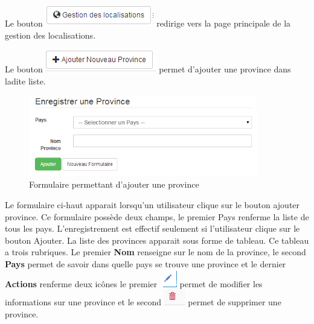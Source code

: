 \documentclass[12pt,a4paper]{report}
\begin{document}
Le bouton \includegraphics[scale=0.7]{pic/GestionEmplacement.png} redirige vers la page principale de la gestion des localisations.

Le bouton \includegraphics[scale=0.7]{pic/AddNewProvince.png} permet d'ajouter une province dans ladite liste.
\begin{figure}[h]
\begin{center}
\includegraphics[width=10cm]{pic/FormNewProvince.png}
\end{center}
\caption{Formulaire permettant d'ajouter une province}
\label{Formulaire permettant d'ajouter une province}
\end{figure}


Le formulaire ci-haut apparait lorsqu'un utilisateur clique sur le bouton ajouter province. Ce formulaire possède deux champs, le premier Pays renferme la liste de tous les pays. 
L'enregistrement est effectif seulement si l'utilisateur clique sur le bouton Ajouter. La liste des provinces apparait sous forme de tableau. Ce tableau a trois rubriques. Le premier \textbf{Nom} renseigne sur le nom de la province, le second \textbf{Pays} permet de savoir dans quelle pays se trouve une province et le dernier \textbf{Actions} renferme deux icônes le premier 
\includegraphics[scale=0.7]{pic/EditUser.png}  permet de modifier les informations sur une province et le second  \includegraphics[scale=0.7]{pic/DeleteWRed.png}  permet de supprimer une province.
\end{document}

